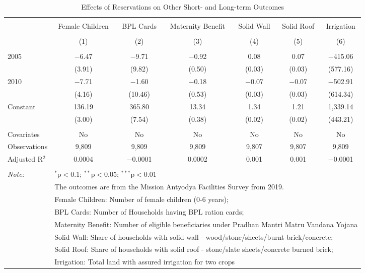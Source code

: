 
\begin{table}[!htbp] \centering 
  \caption{Effects of Reservations on Other Short- and Long-term Outcomes} 
  \label{up_shrug_other_05_10} 
\scriptsize 
\begin{tabular}{@{\extracolsep{0pt}}lcccccc} 
\\[-1.8ex]\hline 
\hline \\[-1.8ex] 
 & Female Children & BPL Cards & Maternity Benefit & Solid Wall & Solid Roof & Irrigation \\ 
\\[-1.8ex] & (1) & (2) & (3) & (4) & (5) & (6)\\ 
\hline \\[-1.8ex] 
 2005 & $-$6.47 & $-$9.71 & $-$0.92 & 0.08 & 0.07 & $-$415.06 \\ 
  & (3.91) & (9.82) & (0.50) & (0.03) & (0.03) & (577.16) \\ 
  2010 & $-$7.71 & $-$1.60 & $-$0.18 & $-$0.07 & $-$0.07 & $-$502.91 \\ 
  & (4.16) & (10.46) & (0.53) & (0.03) & (0.03) & (614.34) \\ 
  Constant & 136.19 & 365.80 & 13.34 & 1.34 & 1.21 & 1,339.14 \\ 
  & (3.00) & (7.54) & (0.38) & (0.02) & (0.02) & (443.21) \\ 
 \hline \\[-1.8ex] 
Covariates & No & No & No & No & No & No \\ 
Observations & 9,809 & 9,809 & 9,809 & 9,807 & 9,807 & 9,809 \\ 
Adjusted R$^{2}$ & 0.0004 & $-$0.0001 & 0.0002 & 0.001 & 0.001 & $-$0.0001 \\ 
\hline 
\hline \\[-1.8ex] 
\textit{Note:}  & \multicolumn{6}{l}{$^{*}$p$<$0.1; $^{**}$p$<$0.05; $^{***}$p$<$0.01} \\ 
 & \multicolumn{6}{l}{The outcomes are from the Mission Antyodya Facilities Survey from 2019.} \\ 
 & \multicolumn{6}{l}{Female Children: Number of female children (0-6 years);} \\ 
 & \multicolumn{6}{l}{BPL Cards: Number of Households having BPL ration cards;} \\ 
 & \multicolumn{6}{l}{Maternity Benefit: Number of eligible beneficiaries under Pradhan Mantri Matru Vandana Yojana} \\ 
 & \multicolumn{6}{l}{Solid Wall: Share of households with solid wall - wood/stone/sheets/burnt brick/concrete;} \\ 
 & \multicolumn{6}{l}{Solid Roof: Share of households with solid roof - stone/slate sheets/concrete burned brick;} \\ 
 & \multicolumn{6}{l}{Irrigation: Total land with assured irrigation for two crops} \\ 
\end{tabular} 
\end{table} 
